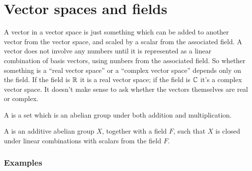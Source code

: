 \section{Vector spaces and fields}\label{real-and-complex-vector-spaces}
A vector in a vector space is just something which can be added to another vector from the vector
space, and scaled by a scalar from the associated field. A vector does not involve any numbers until
it is represented as a linear combination of basis vectors, using nunbers from the associated
field. So whether something is a ``real vector space'' or a ``complex vector space'' depends only on
the field. If the field is $\mathbb{R}$ it is a real vector space; if the field is $\mathbb{C}$ it's a complex
vector space. It doesn't make sense to ask whether the vectors themselves are real or complex.

A  is a set which is an abelian group under both addition and multiplication.

A  is an additive abelian group $X$, together with a field $F$, such that $X$ is
closed under linear combinations with scalars from the field $F$.

\subsubsection{Examples}


